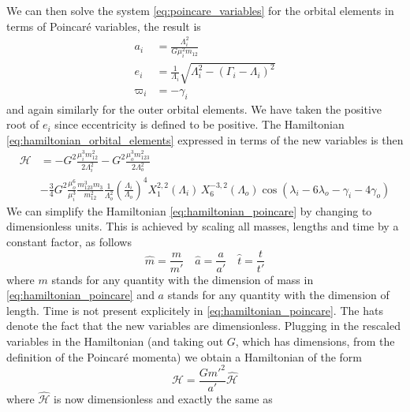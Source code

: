 We can then solve the system 
\ref{eq:poincare_variables} for the orbital elements in terms of Poincaré
variables, the result is
\begin{equation}
    \begin{aligned}
        a_i&= \frac{\Lambda_i^2}{G\mu_i^2m_{12}} \\
        e_i &= \frac{1}{\Lambda_i} \sqrt{\Lambda_i^2-(\Gamma_i-\Lambda_i)^2}\\
        \varpi_i&=-\gamma_i
    \end{aligned}
    \label{eq:orbital_elems_in_terms_of_poincare}
\end{equation}
and again similarly for the outer orbital elements. We have taken the positive root
of $e_i$ since eccentricity is defined to be positive. The Hamiltonian
\ref{eq:hamiltonian_orbital_elements} expressed in terms of the new variables
is then
\begin{equation}
    \begin{aligned}
        \mathcal{H}&=-G^2 \frac{\mu_i^3m_{12}^2}{2\Lambda_i^2}  
        -G^2 \frac{\mu_o^3m_{123}^2}{2\Lambda_o^2}\\ 
        &-\frac{3}{4}G^2 \frac{\mu_o^6}{\mu_i^3} \frac{m_{123}^3m_3}{m_{12}^2}
        \frac{1}{\Lambda_o^2} \left(\frac{\Lambda_i}{\Lambda_o}\right)^4
    X^{2,2}_1(\Lambda_i)\,X^{-3,2}_6(\Lambda_o)\cos(\lambda_i-6\lambda_o
    -\gamma_i - 4\gamma_o)
    \end{aligned}
    \label{eq:hamiltonian_poincare}
\end{equation}
We can simplify the Hamiltonian \ref{eq:hamiltonian_poincare} by changing
to dimensionless units. This is achieved by scaling all masses, lengths and
time by a constant factor, as follows
\begin{equation}
    \hat m= \frac{m}{m'} \quad\hat a= \frac{a}{a'}\quad \hat t = \frac{t}{t'}  
\end{equation}
where $m$ stands for any quantity with the dimension of mass in 
\cref{eq:hamiltonian_poincare} and $a$ stands for any quantity with the 
dimension of length. Time is not present explicitely in \cref{eq:hamiltonian_poincare}.
The hats denote the fact that the new variables are dimensionless. Plugging in the
rescaled variables in the Hamiltonian (and taking out $G$, which has dimensions, from
the definition of the Poincaré momenta) we obtain a Hamiltonian of the form
\begin{equation}
    \mathcal{H}= \frac{Gm'^2}{a'} \mathcal{\hat H}
\end{equation}
where $\mathcal{\hat H}$ is now dimensionless and exactly the same as
